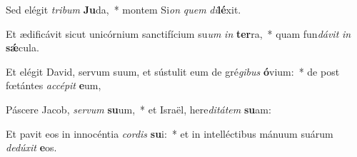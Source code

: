 \item Sed elégit \textit{tri}\textit{bum} \textbf{Ju}da,~* montem Si\textit{on} \textit{quem} \textit{di}\textbf{lé}xit.
\item Et ædificávit sicut unicórnium sanctifícium su\textit{um} \textit{in} \textbf{ter}ra,~* quam fun\textit{dá}\textit{vit} \textit{in} \textbf{sǽ}cula.
\item Et elégit David, servum suum, et sústulit eum de gré\textit{gi}\textit{bus} \textbf{ó}vium:~* de post fœtántes \textit{ac}\textit{cé}\textit{pit} \textbf{e}um,
\item Páscere Jacob, \textit{ser}\textit{vum} \textbf{su}um,~* et Israël, here\textit{di}\textit{tá}\textit{tem} \textbf{su}am:
\item Et pavit eos in innocéntia \textit{cor}\textit{dis} \textbf{su}i:~* et in intelléctibus mánuum suárum \textit{de}\textit{dú}\textit{xit} \textbf{e}os.
